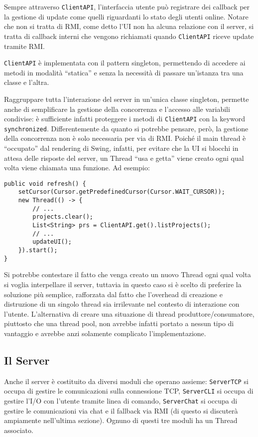 \documentclass[a4paper,11pt] {article}
\begin{document}
Sempre attraverso \texttt{ClientAPI}, l'interfaccia utente può registrare dei callback per la gestione di update come quelli riguardanti lo stato degli utenti online. Notare che non si tratta di RMI, come detto l'UI non ha alcuna relazione con il server, si tratta di callback interni che vengono richiamati quando \texttt{ClientAPI} riceve update tramite RMI.

\texttt{ClientAPI} è implementata con il pattern singleton, permettendo di accedere ai metodi in modalità ``statica'' e senza la necessità di passare un'istanza tra una classe e l'altra.

Raggruppare tutta l'interazione del server in un'unica classe singleton, permette anche di semplificare la gestione della concorrenza e l'accesso alle variabili condivise: è sufficiente infatti proteggere i metodi di \texttt{ClientAPI} con la keyword \texttt{synchronized}. Differentemente da quanto si potrebbe pensare, però, la gestione della concorrenza non è solo necessaria per via di RMI. Poiché il main thread è ``occupato'' dal rendering di Swing, infatti, per evitare che la UI si blocchi in attesa delle risposte del server, un Thread ``usa e getta'' viene creato ogni qual volta viene chiamata una funzione. Ad esempio:

\begin{verbatim}
public void refresh() {
	setCursor(Cursor.getPredefinedCursor(Cursor.WAIT_CURSOR));
	new Thread(() -> {
		// ...
		projects.clear();
		List<String> prs = ClientAPI.get().listProjects();
		// ...
		updateUI();
	}).start();
}
\end{verbatim}
Si potrebbe contestare il fatto che venga creato un nuovo Thread ogni qual volta si voglia interpellare il server, tuttavia in questo caso si è scelto di preferire la soluzione più semplice, rafforzata dal fatto che l'overhead di creazione e distruzione di un singolo thread sia irrilevante nel contesto di interazione con l'utente. L'alternativa di creare una situazione di thread produttore/consumatore, piuttosto che una thread pool, non avrebbe infatti portato a nessun tipo di vantaggio e avrebbe anzi solamente complicato l'implementazione.

\subsection*{Il Server}

Anche il server è costituito da diversi moduli che operano assieme: \texttt{ServerTCP} si occupa di gestire le comunicazioni sulla connessione TCP, \texttt{ServerCLI} si occupa di gestire l'I/O con l'utente tramite linea di comando, \texttt{ServerChat} si occupa di gestire le comunicazioni via chat e il fallback via RMI (di questo si discuterà ampiamente nell'ultima sezione). Ognuno di questi tre moduli ha un Thread associato.
\end{document}
